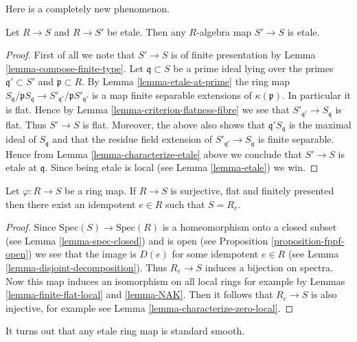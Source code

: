 \noindent
Here is a completely new phenomenon.

\begin{lemma}
\label{lemma-map-between-etale}
Let $R \to S$ and $R \to S'$ be etale.
Then any $R$-algebra map $S' \to S$ is etale.
\end{lemma}

\begin{proof}
First of all we note that $S' \to S$ is of finite presentation by
Lemma \ref{lemma-compose-finite-type}.
Let $\mathfrak q \subset S$ be a prime ideal lying over the primes
$\mathfrak q' \subset S'$ and $\mathfrak p \subset R$.
By Lemma \ref{lemma-etale-at-prime} the ring map
$S_{\mathfrak q}/\mathfrak p S_{\mathfrak q} \to
S'_{\mathfrak q'}/\mathfrak p S'_{\mathfrak q'}$
is a map finite separable extensions of $\kappa(\mathfrak p)$.
In particular it is flat. Hence by
Lemma \ref{lemma-criterion-flatness-fibre} we see that
$S'_{\mathfrak q'} \to S_{\mathfrak q}$ is flat. Thus $S' \to S$
is flat. Moreover, the above also shows that $\mathfrak q'S_{\mathfrak q}$
is the maximal ideal of $S_{\mathfrak q}$ and that the residue
field extension of $S'_{\mathfrak q'} \to S_{\mathfrak q}$ is
finite separable. Hence from Lemma \ref{lemma-characterize-etale}
above we conclude that $S' \to S$ is etale at $\mathfrak q$. Since
being etale is local (see Lemma \ref{lemma-etale}) we win.
\end{proof}

\begin{lemma}
\label{lemma-surjective-flat-finitely-presented}
Let $\varphi :R \to S$ be a ring map. If $R \to S$ is surjective, flat and
finitely presented then there exist an idempotent $e \in R$ such that
$S = R_e$.
\end{lemma}

\begin{proof}
Since $\text{Spec}(S) \to \text{Spec}(R)$ is a homeomorphism
onto a closed subset (see Lemma \ref{lemma-spec-closed}) and
is open (see Proposition \ref{proposition-fppf-open}) we see that
the image is $D(e)$ for some idempotent $e \in R$ (see
Lemma \ref{lemma-disjoint-decomposition}). Thus $R_e \to S$
induces a bijection on spectra. Now this map induces an isomorphism
on all local rings for example by
Lemmas \ref{lemma-finite-flat-local} and \ref{lemma-NAK}.
Then it follows that $R_e \to S$ is also injective, for example
see Lemma \ref{lemma-characterize-zero-local}.
\end{proof}

\noindent
It turns out that any etale ring map is standard smooth.

